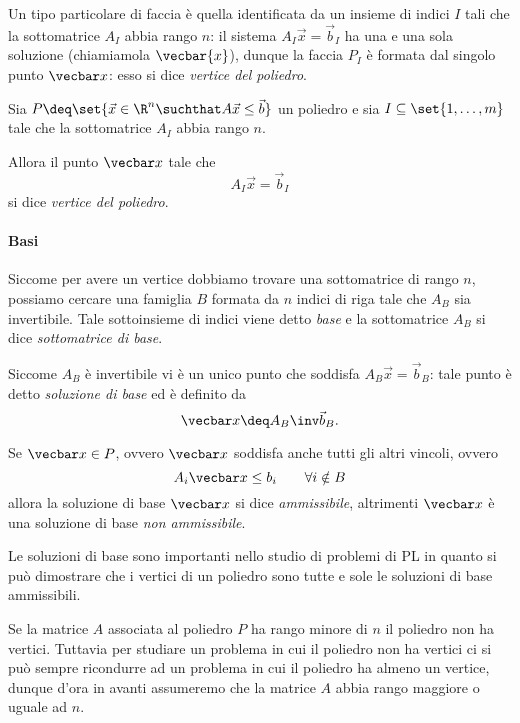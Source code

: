 Un tipo particolare di faccia è quella identificata da un insieme di indici $I$ tali che la sottomatrice $A_I$ abbia rango $n$: il sistema $A_I\vec x = \vec b_I$ ha una e una sola soluzione (chiamiamola $\vecbar{x}$), dunque la faccia $P_I$ è formata dal singolo punto $\vecbar x$: esso si dice \emph{vertice del poliedro}.

\begin{definition}
    Sia $P \deq \set{\vec x \in \R^n \suchthat A\vec x \leq \vec b}$ un poliedro e sia $I \subseteq \set{1, \dots, m}$ tale che la sottomatrice $A_I$ abbia rango $n$.

    Allora il punto $\vecbar x$ tale che \[
        A_I\vec x = \vec b_I   
    \] si dice \emph{vertice del poliedro}.
\end{definition}

\paragraph{Basi} Siccome per avere un vertice dobbiamo trovare una sottomatrice di rango $n$, possiamo cercare una famiglia $B$ formata da $n$ indici di riga tale che $A_B$ sia invertibile. Tale sottoinsieme di indici viene detto \emph{base} e la sottomatrice $A_B$ si dice \emph{sottomatrice di base}.

Siccome $A_B$ è invertibile vi è un unico punto che soddisfa $A_B\vec x = \vec b_B$: tale punto è detto \emph{soluzione di base} ed è definito da \begin{equation*}
    \vecbar x \deq A_B\inv \vec b_B.    
\end{equation*}

Se $\vecbar x \in P$, ovvero $\vecbar x$ soddisfa anche tutti gli altri vincoli, ovvero \[
    A_i\vecbar x \leq b_i \qquad \forall i \notin B    
\] allora la soluzione di base $\vecbar x$ si dice \emph{ammissibile}, altrimenti $\vecbar x$ è una soluzione di base \emph{non ammissibile}.

Le soluzioni di base sono importanti nello studio di problemi di PL in quanto si può dimostrare che i vertici di un poliedro sono tutte e sole le soluzioni di base ammissibili.

Se la matrice $A$ associata al poliedro $P$ ha rango minore di $n$ il poliedro non ha vertici. Tuttavia per studiare un problema in cui il poliedro non ha vertici ci si può sempre ricondurre ad un problema in cui il poliedro ha almeno un vertice, dunque d'ora in avanti assumeremo che la matrice $A$ abbia rango maggiore o uguale ad $n$.

